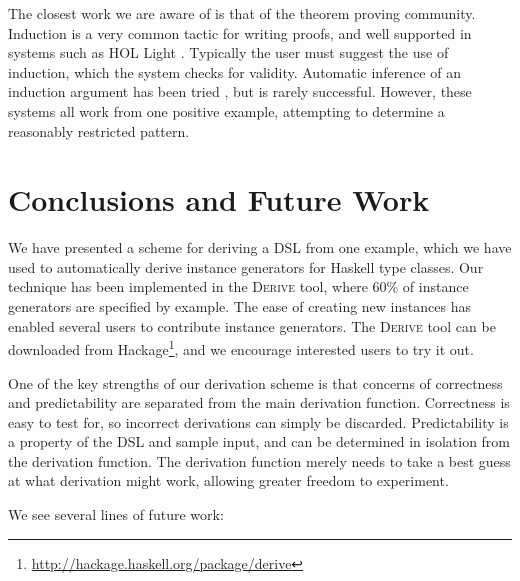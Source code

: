 \documentclass{llncs}
\newcommand{\derive}{\textsc{Derive}}
\begin{document}
The closest work we are aware of is that of the theorem proving community. Induction is a very common tactic for writing proofs, and well supported in systems such as HOL Light \cite{hol_light}. Typically the user must suggest the use of induction, which the system checks for validity. Automatic inference of an induction argument has been tried \cite{mintchev:reasoning}, but is rarely successful. However, these systems all work from one positive example, attempting to determine a reasonably restricted pattern.

\section{Conclusions and Future Work}
\label{sec:conclusion}

We have presented a scheme for deriving a DSL from one example, which we have used to automatically derive instance generators for Haskell type classes. Our technique has been implemented in the \derive{} tool, where 60\% of instance generators are specified by example. The ease of creating new instances has enabled several users to contribute instance generators. The \derive{} tool can be downloaded from Hackage\footnote{\url{http://hackage.haskell.org/package/derive}}, and we encourage interested users to try it out.

One of the key strengths of our derivation scheme is that concerns of correctness and predictability are separated from the main derivation function. Correctness is easy to test for, so incorrect derivations can simply be discarded. Predictability is a property of the DSL and sample input, and can be determined in isolation from the derivation function. The derivation function merely needs to take a best guess at what derivation might work, allowing greater freedom to experiment.

We see several lines of future work:
\end{document}
